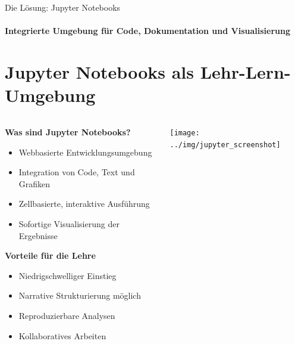 \documentclass[aspectratio=169,11pt]{beamer}
\begin{document}
\begin{frame}{Die Lösung: Jupyter Notebooks \cite{kluyver2016, barba2023}}
\framesubtitle{Integrierte Umgebung für Code, Dokumentation und Visualisierung}
\section{Jupyter Notebooks als Lehr-Lern-Umgebung} 
    \begin{columns}[T]
    \hspace*{-0.5cm}
        \begin{column}{0.55\textwidth}
            \textbf{Was sind Jupyter Notebooks?}
            \begin{itemize}
                \item Webbasierte Entwicklungsumgebung
                \item Integration von Code, Text und Grafiken
                \item Zellbasierte, interaktive Ausführung
                \item Sofortige Visualisierung der Ergebnisse
            \end{itemize}
            
            \vspace{0.5em}
            \textbf{Vorteile für die Lehre}
            \begin{itemize}
                \item Niedrigschwelliger Einstieg
                \item Narrative Strukturierung möglich
                \item Reproduzierbare Analysen
                \item Kollaboratives Arbeiten
            \end{itemize}
        \end{column}
        \begin{column}{0.4\textwidth}
            \begin{center}
                \texttt{[image: ../img/jupyter\_screenshot]}
            \end{center}
        \end{column}
    \end{columns}
\end{frame}
\end{document}
